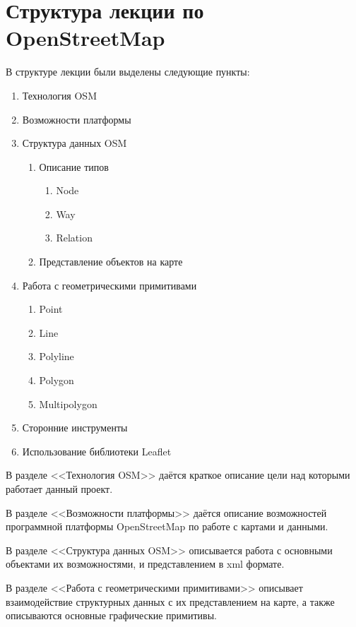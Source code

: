 \documentclass[a4paper, 14pt]{extreport}
\begin{document}
    \chapter{Структура лекции по OpenStreetMap}
    В структуре лекции были выделены следующие пункты:
    \begin{enumerate}
        \item Технология OSM
        \item Возможности платформы
        \item Структура данных OSM
        \begin{enumerate}
            \item Описание типов
            \begin{enumerate}
                \item Node
                \item Way
                \item Relation
            \end{enumerate}
            \item Представление объектов на карте
        \end{enumerate}
        \item Работа с геометрическими примитивами
        \begin{enumerate}
            \item Point
            \item Line
            \item Polyline
            \item Polygon
            \item Multipolygon
        \end{enumerate}
        \item Сторонние инструменты
        \item Использование библиотеки Leaflet
    \end{enumerate}

    \newpage

    В разделе <<Технология OSM>> даётся краткое описание цели над которыми работает данный 
    проект.

    В разделе <<Возможности платформы>> даётся описание возможностей программной платформы 
    OpenStreetMap по работе с картами и данными.

    В разделе <<Структура данных OSM>> описывается работа с основными объектами их возможностями, и 
    представлением в xml формате.

    В разделе <<Работа с геометрическими примитивами>> описывает взаимодействие структурных 
    данных с их представлением на карте, а также описываются основные графические примитивы.
\end{document}
